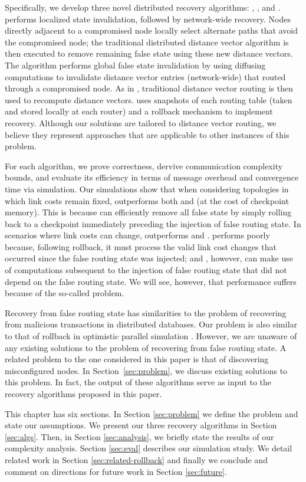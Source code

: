 Specifically, we develop three novel distributed recovery algorithms: \seconds, \purges, and \cprs. \second performs localized state invalidation, followed by network-wide recovery. 
Nodes directly adjacent to a compromised node locally select alternate paths that avoid the compromised node; the traditional distributed distance vector algorithm is then executed to 
remove remaining false state using these new distance vectors. The \purge algorithm performs global false state invalidation by using diffusing computations to invalidate distance vector 
entries (network-wide) that routed through a compromised node. As in \seconds, traditional distance vector routing is then used to recompute distance vectors. 
\cpr uses snapshots of each routing table (taken and stored locally at each router) and a rollback mechanism to implement recovery.
Although our solutions are tailored to distance vector routing, we believe they represent approaches that are applicable to other instances of this problem.

For each algorithm, we prove correctness, dervive communication complexity bounds, and evaluate its efficiency in terms of message overhead and convergence time via simulation. 
Our simulations show that when considering topologies in which link costs remain fixed, \cpr outperforms both \purge and \second (at the cost of checkpoint memory). This is because \cpr can efficiently remove all false state by simply rolling back
to a checkpoint immediately preceding the injection of false routing state. In scenarios where link costs can change, \purge outperforms \cpr and \seconds. \cpr performs poorly because, following 
rollback, it must process the valid link cost changes that occurred since the false routing state was injected;  \second and \purges, however, can make use of computations subsequent to the 
injection of false routing state that did not depend on the false routing state. We will see, however, that \second performance suffers because of the so-called \infinity problem.


Recovery from false routing state has similarities to the problem of
recovering from malicious transactions \cite{Liu98, Liu00} in
distributed databases. Our problem is also similar to that of rollback
in optimistic parallel simulation \cite{Jeff}. However, we are unaware
of any existing solutions to the problem of recovering from false
routing state. A related problem to the one considered in this
paper is that of discovering misconfigured nodes. In
Section~\ref{sec:problem}, we discuss existing solutions to this
problem. In fact, the output of these algorithms serve as input to the
recovery algorithms proposed in this paper.

This chapter has six sections. In Section \ref{sec:problem} we define the problem and state our assumptions.
We present our three recovery algorithms in Section \ref{sec:algs}.  Then, in Section \ref{sec:analysis}, we briefly state the results of our complexity analysis.
Section \ref{sec:eval} describes our simulation study. We detail related work in Section \ref{sec:related-rollback} and finally we conclude and 
comment on directions for future work in Section \ref{sec:future}.




